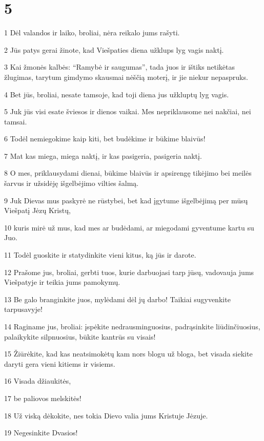 \chapter{5}


\par 1 Dėl valandos ir laiko, broliai, nėra reikalo jums rašyti. 
\par 2 Jūs patys gerai žinote, kad Viešpaties diena užklups lyg vagis naktį. 
\par 3 Kai žmonės kalbės: “Ramybė ir saugumas”, tada juos ir ištiks netikėtas žlugimas, tarytum gimdymo skausmai nėščią moterį, ir jie niekur nepaspruks. 
\par 4 Bet jūs, broliai, nesate tamsoje, kad toji diena jus užkluptų lyg vagis. 
\par 5 Juk jūs visi esate šviesos ir dienos vaikai. Mes nepriklausome nei nakčiai, nei tamsai. 
\par 6 Todėl nemiegokime kaip kiti, bet budėkime ir būkime blaivūs! 
\par 7 Mat kas miega, miega naktį, ir kas pasigeria, pasigeria naktį. 
\par 8 O mes, priklausydami dienai, būkime blaivūs ir apsirengę tikėjimo bei meilės šarvus ir užsidėję išgelbėjimo vilties šalmą. 
\par 9 Juk Dievas mus paskyrė ne rūstybei, bet kad įgytume išgelbėjimą per mūsų Viešpatį Jėzų Kristų, 
\par 10 kuris mirė už mus, kad mes ar budėdami, ar miegodami gyventume kartu su Juo. 
\par 11 Todėl guoskite ir statydinkite vieni kitus, ką jūs ir darote. 
\par 12 Prašome jus, broliai, gerbti tuos, kurie darbuojasi tarp jūsų, vadovauja jums Viešpatyje ir teikia jums pamokymų. 
\par 13 Be galo branginkite juos, mylėdami dėl jų darbo! Taikiai sugyvenkite tarpusavyje! 
\par 14 Raginame jus, broliai: įspėkite nedrausminguosius, padrąsinkite liūdinčiuosius, palaikykite silpnuosius, būkite kantrūs su visais! 
\par 15 Žiūrėkite, kad kas neatsimokėtų kam nors blogu už bloga, bet visada siekite daryti gera vieni kitiems ir visiems. 
\par 16 Visada džiaukitės, 
\par 17 be paliovos melskitės! 
\par 18 Už viską dėkokite, nes tokia Dievo valia jums Kristuje Jėzuje. 
\par 19 Negesinkite Dvasios! 
